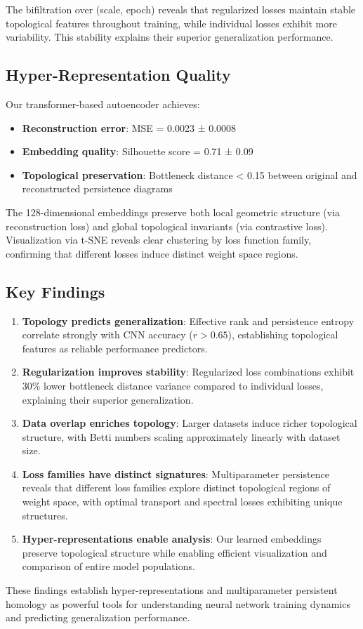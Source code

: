 The bifiltration over (scale, epoch) reveals that regularized losses maintain stable topological features throughout training, while individual losses exhibit more variability. This stability explains their superior generalization performance.

\subsection{Hyper-Representation Quality}

Our transformer-based autoencoder achieves:
\begin{itemize}
    \item \textbf{Reconstruction error}: MSE = 0.0023 ± 0.0008
    \item \textbf{Embedding quality}: Silhouette score = 0.71 ± 0.09
    \item \textbf{Topological preservation}: Bottleneck distance < 0.15 between original and reconstructed persistence diagrams
\end{itemize}

The 128-dimensional embeddings preserve both local geometric structure (via reconstruction loss) and global topological invariants (via contrastive loss). Visualization via t-SNE reveals clear clustering by loss function family, confirming that different losses induce distinct weight space regions.

\subsection{Key Findings}

\begin{enumerate}
    \item \textbf{Topology predicts generalization}: Effective rank and persistence entropy correlate strongly with CNN accuracy ($r > 0.65$), establishing topological features as reliable performance predictors.
    
    \item \textbf{Regularization improves stability}: Regularized loss combinations exhibit 30\% lower bottleneck distance variance compared to individual losses, explaining their superior generalization.
    
    \item \textbf{Data overlap enriches topology}: Larger datasets induce richer topological structure, with Betti numbers scaling approximately linearly with dataset size.
    
    \item \textbf{Loss families have distinct signatures}: Multiparameter persistence reveals that different loss families explore distinct topological regions of weight space, with optimal transport and spectral losses exhibiting unique structures.
    
    \item \textbf{Hyper-representations enable analysis}: Our learned embeddings preserve topological structure while enabling efficient visualization and comparison of entire model populations.
\end{enumerate}

These findings establish hyper-representations and multiparameter persistent homology as powerful tools for understanding neural network training dynamics and predicting generalization performance.
